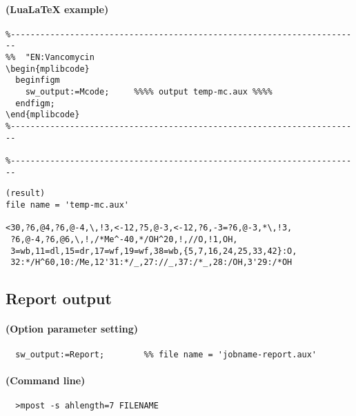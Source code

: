 \documentclass[a4paper]{article}
\begin{document}
\paragraph{(LuaLaTeX example)}
\begin{verbatim}
%-----------------------------------------------------------------------
%%  "EN:Vancomycin
\begin{mplibcode}
  beginfigm
    sw_output:=Mcode;     %%%% output temp-mc.aux %%%%
  endfigm;
\end{mplibcode}
%-----------------------------------------------------------------------

%-----------------------------------------------------------------------
\end{verbatim}
\begin{verbatim}
(result)
file name = 'temp-mc.aux'

<30,?6,@4,?6,@-4,\,!3,<-12,?5,@-3,<-12,?6,-3=?6,@-3,*\,!3,
 ?6,@-4,?6,@6,\,!,/*Me^-40,*/OH^20,!,//O,!1,OH,
 3=wb,11=dl,15=dr,17=wf,19=wf,38=wb,{5,7,16,24,25,33,42}:O,
 32:*/H^60,10:/Me,12'31:*/_,27://_,37:/*_,28:/OH,3'29:/*OH
\end{verbatim}
\newpage
\noindent%
\subsection{Report output}
\paragraph{(Option parameter setting)}
%
%
\begin{verbatim}
  sw_output:=Report;        %% file name = 'jobname-report.aux'
\end{verbatim}
\paragraph{(Command line)}
\begin{verbatim}
  >mpost -s ahlength=7 FILENAME
\end{verbatim}
\end{document}
